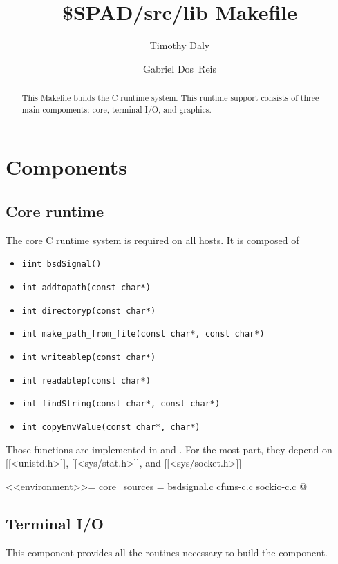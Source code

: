 \documentclass{article}
\title{\$SPAD/src/lib Makefile}
\author{Timothy Daly \and Gabriel Dos~Reis}
\begin{document}
\maketitle

\begin{abstract}
  This Makefile builds the  C runtime system.  This runtime
  support consists of three main compoments: core, terminal I/O, and
  graphics.
\end{abstract}
\eject

\tableofcontents
\eject

\section{Components}

\subsection{Core runtime}

The core C runtime system is required on all hosts. It is composed of
\begin{itemize}
\item \verb!iint bsdSignal()!
\item \verb!int addtopath(const char*)!
\item \verb!int directoryp(const char*)!
\item \verb!int make_path_from_file(const char*, const char*)!
\item \verb!int writeablep(const char*)!
\item \verb!int readablep(const char*)!
\item \verb!int findString(const char*, const char*)!
\item \verb!int copyEnvValue(const char*, char*)!
\end{itemize}

Those functions are implemented in  and
.  For the most part,
they depend on [[<unistd.h>]], [[<sys/stat.h>]], and
[[<sys/socket.h>]]

<<environment>>=
core_sources = bsdsignal.c cfuns-c.c sockio-c.c
@


\subsection{Terminal I/O}

This component provides all the routines necessary to build
the  component.
\end{document}

